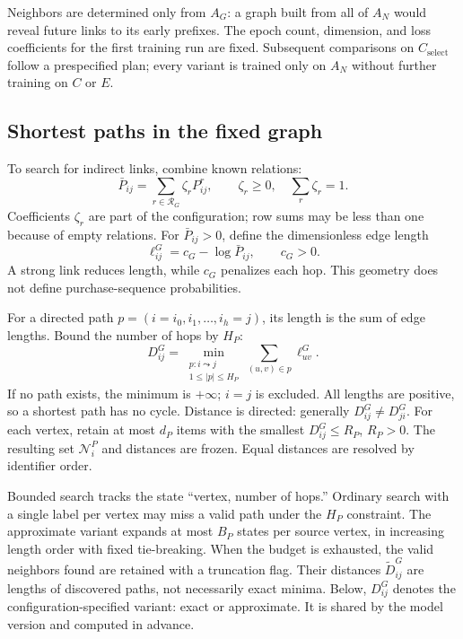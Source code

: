 \documentclass[12pt,a4paper]{article}
\theoremstyle{plainru}
\begin{document}
Neighbors are determined only from $A_G$: a graph built from all of $A_N$ would reveal
future links to its early prefixes. The epoch count, dimension, and loss
coefficients for the first training run are fixed. Subsequent comparisons on $C_{\mathrm{select}}$
follow a prespecified plan; every variant is trained only on $A_N$
without further training on $C$ or $E$.

\subsection{Shortest paths in the fixed graph}
\label{sec:modern-paths}

To search for indirect links, combine known relations:
\begin{equation}\label{eq:modern-path-base}
\bar P_{ij}=\sum_{r\in\mathcal R_G}\zeta_rP^r_{ij},\qquad
\zeta_r\ge0,\quad\sum_r\zeta_r=1.
\end{equation}
Coefficients $\zeta_r$ are part of the configuration; row sums may be
less than one because of empty relations. For $\bar P_{ij}>0$,
define the dimensionless edge length
\begin{equation}\label{eq:modern-path-edge}
\ell_{ij}^{G}=c_G-\log\bar P_{ij},\qquad c_G>0.
\end{equation}
A strong link reduces length, while $c_G$ penalizes each hop.
This geometry does not define purchase-sequence probabilities.

For a directed path $p=(i=i_0,i_1,\ldots,i_h=j)$, its length
is the sum of edge lengths. Bound the number of hops by $H_P$:
\begin{equation}\label{eq:modern-distance}
D_{ij}^{G}=
\min_{\substack{p:i\leadsto j\\1\le |p|\le H_P}}
\sum_{(u,v)\in p}\ell_{uv}^{G}.
\end{equation}
If no path exists, the minimum is $+\infty$; $i=j$ is excluded.
All lengths are positive, so a shortest path has no cycle.
Distance is directed: generally $D_{ij}^{G}\ne D_{ji}^{G}$.
For each vertex, retain at most $d_P$ items
with the smallest $D_{ij}^{G}\le R_P$, $R_P>0$.
The resulting set $\mathcal N_i^{P}$ and distances are frozen.
Equal distances are resolved by identifier order.

Bounded search tracks the state ``vertex, number of hops.''
Ordinary search with a single label per vertex may miss
a valid path under the $H_P$ constraint.
The approximate variant expands at most $B_P$ states
per source vertex, in increasing length order with fixed tie-breaking.
When the budget is exhausted, the valid neighbors found are retained
with a truncation flag. Their distances $\widetilde D_{ij}^{G}$ are lengths
of discovered paths, not necessarily exact minima.
Below, $D_{ij}^{G}$ denotes the configuration-specified variant:
exact or approximate. It is shared by the model version and computed in advance.
\end{document}
